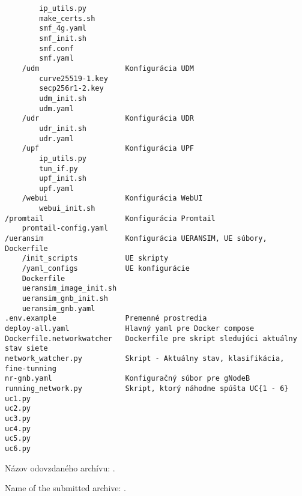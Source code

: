 \begin{verbatim}
        ip_utils.py
        make_certs.sh
        smf_4g.yaml
        smf_init.sh
        smf.conf
        smf.yaml
    /udm                    Konfigurácia UDM
        curve25519-1.key
        secp256r1-2.key
        udm_init.sh
        udm.yaml
    /udr                    Konfigurácia UDR
        udr_init.sh
        udr.yaml
    /upf                    Konfigurácia UPF
        ip_utils.py
        tun_if.py
        upf_init.sh
        upf.yaml
    /webui                  Konfigurácia WebUI
        webui_init.sh
/promtail                   Konfigurácia Promtail
    promtail-config.yaml
/ueransim                   Konfigurácia UERANSIM, UE súbory, Dockerfile
    /init_scripts           UE skripty
    /yaml_configs           UE konfigurácie
    Dockerfile
    ueransim_image_init.sh
    ueransim_gnb_init.sh
    ueransim_gnb.yaml
.env.example                Premenné prostredia
deploy-all.yaml             Hlavný yaml pre Docker compose
Dockerfile.networkwatcher   Dockerfile pre skript sledujúci aktuálny stav siete
network_watcher.py          Skript - Aktuálny stav, klasifikácia, fine-tunning
nr-gnb.yaml                 Konfiguračný súbor pre gNodeB
running_network.py          Skript, ktorý náhodne spúšta UC{1 - 6}
uc1.py
uc2.py
uc3.py
uc4.py
uc5.py
uc6.py

\end{verbatim}



\ifx\FIITlagEN\undefined
\par Názov odovzdaného archívu: \FIITArchiveName.
\else
\par Name of the submitted archive: \FIITArchiveName.
\fi
